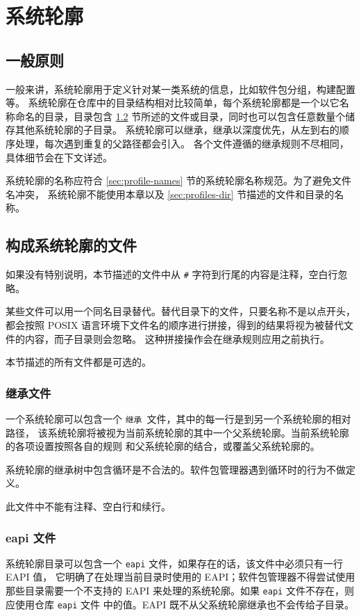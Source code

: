 \chapter{系统轮廓}
\label{ch:profiles}

\section{一般原则}
一般来讲，系统轮廓用于定义针对某一类系统的信息，比如软件包分组，构建配置等。
系统轮廓在仓库中的目录结构相对比较简单，每个系统轮廓都是一个以它名称命名的目录，目录包含
\ref{sec:profile-files} 节所述的文件或目录，同时也可以包含任意数量个储存其他系统轮廓的子目录。
系统轮廓可以继承，继承以深度优先，从左到右的顺序处理，每次遇到重复的父路径都会引入。
各个文件遵循的继承规则不尽相同，具体细节会在下文详述。

系统轮廓的名称应符合 \ref{sec:profile-names} 节的系统轮廓名称规范。为了避免文件名冲突，
系统轮廓不能使用本章以及 \ref{sec:profiles-dir} 节描述的文件和目录的名称。

\section{构成系统轮廓的文件}
\label{sec:profile-files}
如果没有特别说明，本节描述的文件中从 \texttt{\#} 字符到行尾的内容是注释，空白行忽略。

某些文件可以用一个同名目录替代。替代目录下的文件，只要名称不是以点开头，都会按照 POSIX
语言环境下文件名的顺序进行拼接，得到的结果将视为被替代文件的内容，而子目录则会忽略。
这种拼接操作会在继承规则应用之前执行。

本节描述的所有文件都是可选的。

\subsection{继承文件}
一个系统轮廓可以包含一个 \texttt{继承}\ 文件，其中的每一行是到另一个系统轮廓的相对路径，
该系统轮廓将被视为当前系统轮廓的其中一个父系统轮廓。当前系统轮廓的各项设置按照各自的规则
和父系统轮廓的结合，或覆盖父系统轮廓的。

系统轮廓的继承树中包含循环是不合法的。软件包管理器遇到循环时的行为不做定义。

此文件中不能有注释、空白行和续行。

\subsection{eapi 文件}
系统轮廓目录可以包含一个 \texttt{eapi} 文件，如果存在的话，该文件中必须只有一行 EAPI 值，
它明确了在处理当前目录时使用的 EAPI；软件包管理器不得尝试使用那些目录需要一个不支持的
EAPI 来处理的系统轮廓。如果 \texttt{eapi} 文件不存在，则应使用仓库 \texttt{eapi} 文件
中的值。EAPI 既不从父系统轮廓继承也不会传给子目录。

